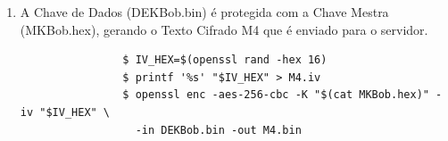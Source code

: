 \begin{enumerate}
		\begin{tcolorbox}[width=\textwidth]
			{\scriptsize
				\begin{verbatim}
				$ IV_HEX=$(openssl rand -hex 16)
				$ printf '%s' "$IV_HEX" > M3.iv
				$ openssl enc -aes-256-cbc -K "$(cat MKBob.hex)" -iv "$IV_HEX" \
				  -in KPrBob.pem -out M3.bin
				\end{verbatim}
			}
		\end{tcolorbox}
		\item A Chave de Dados (DEKBob.bin) é protegida com a Chave Mestra (MKBob.hex), gerando o Texto Cifrado M4 que é enviado para o servidor.
		\begin{tcolorbox}[width=\textwidth]
			{\scriptsize
				\begin{verbatim}
				$ IV_HEX=$(openssl rand -hex 16)
				$ printf '%s' "$IV_HEX" > M4.iv
				$ openssl enc -aes-256-cbc -K "$(cat MKBob.hex)" -iv "$IV_HEX" \
				  -in DEKBob.bin -out M4.bin
				\end{verbatim}
			}
		\end{tcolorbox}
\end{enumerate}

\pagebreak
